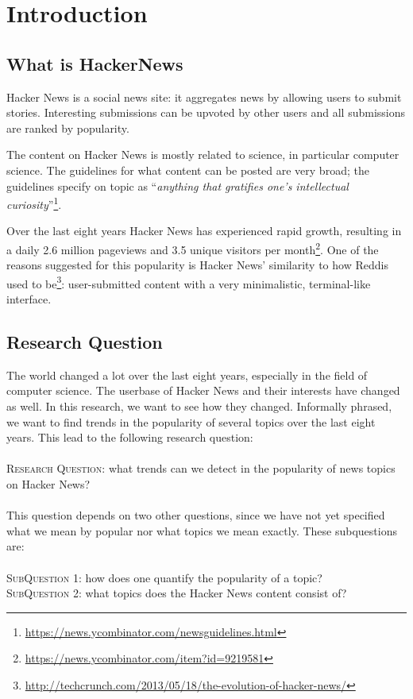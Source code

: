 \section{Introduction}
\subsection{What is HackerNews}
Hacker News is a social news site: it aggregates news by allowing users to submit stories. Interesting submissions can be upvoted by other users and all submissions are ranked by popularity.

The content on Hacker News is mostly related to science, in particular computer science. The guidelines for what content can be posted are very broad; the guidelines specify on topic as ``\textit{anything that gratifies one's intellectual curiosity}''\footnote{\url{https://news.ycombinator.com/newsguidelines.html}}.

Over the last eight years Hacker News has experienced rapid growth, resulting in a daily 2.6 million pageviews and 3.5 unique visitors per month\footnote{\url{https://news.ycombinator.com/item?id=9219581}}. One of the reasons suggested for this popularity is Hacker News' similarity to how Reddis used to be\footnote{\url{http://techcrunch.com/2013/05/18/the-evolution-of-hacker-news/}}: user-submitted content with a very minimalistic, terminal-like interface.

\subsection{Research Question}
The world changed a lot over the last eight years, especially in the field of computer science.  The userbase of Hacker News and their interests have changed as well. In this research, we want to see how they changed. Informally phrased, we want to find trends in the popularity of several topics over the last eight years. This lead to the following research question:\\
\\
\textsc{Research Question:} what trends can we detect in the popularity of news topics on Hacker News?\\
\\
This question depends on two other questions, since we have not yet specified what we mean by popular nor what topics we mean exactly. These subquestions are:\\
\\
\textsc{SubQuestion 1:} how does one quantify the popularity of a topic?\\
\textsc{SubQuestion 2:} what topics does the Hacker News content consist of?\\

